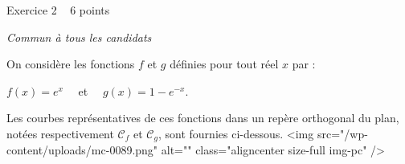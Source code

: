 
%
\begin{h2}Exercice 2   6 points\end{h2}
\textit{Commun à tous les candidats}
\par
On considère les fonctions $f$ et $g$ définies pour tout réel $x$ par :

\begin{center}
$f\left(x\right)=e^{x} \quad $     et    $ \quad  g\left(x\right)=1-e^{-x}.$
\end{center}
Les courbes représentatives de ces fonctions dans un repère orthogonal du plan, notées respectivement $\mathscr C_{f}$ et $\mathscr C_{g}$, sont fournies ci-dessous.
<img src="/wp-content/uploads/mc-0089.png" alt="" class="aligncenter size-full  img-pc" />

